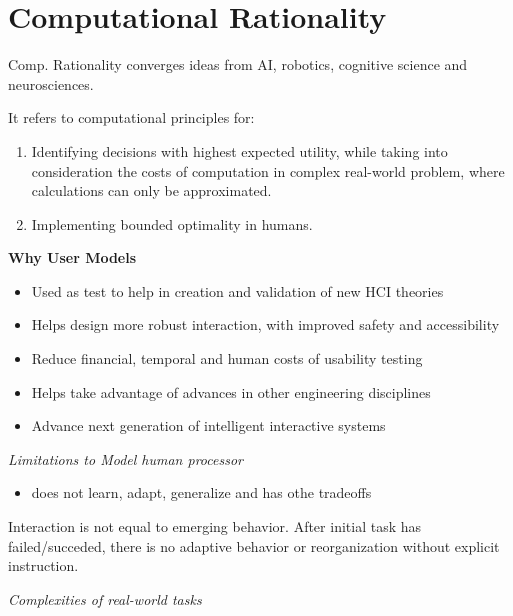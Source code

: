 \section{Computational Rationality}

Comp. Rationality converges ideas from AI, robotics, cognitive science and neurosciences. 

It refers to computational principles for:
\begin{enumerate}[itemsep=-5pt, topsep=0pt, leftmargin=*]
    \item Identifying decisions with highest expected utility, while taking into consideration the costs of computation in complex real-world problem, where calculations can only be approximated.
    \item Implementing bounded optimality in humans. 
\end{enumerate}

\textbf{Why User Models}

\begin{itemize}[itemsep=-5pt, topsep=0pt, leftmargin=*]
	\item Used as test to help in creation and validation of new HCI theories
	\item Helps design more robust interaction, with improved safety and accessibility
	\item Reduce financial, temporal and human costs of usability testing
	\item Helps take advantage of advances in other engineering disciplines
	\item Advance next generation of intelligent interactive systems
\end{itemize}

\textit{Limitations to Model human processor} \smallskip

\begin{itemize}[itemsep=-5pt, topsep=0pt, leftmargin=*]
	\item does not learn, adapt, generalize and has othe tradeoffs
\end{itemize}
Interaction is not equal to emerging behavior. After initial task has failed/succeded, there is no adaptive behavior or reorganization without explicit instruction.

\textit{Complexities of real-world tasks} \smallskip

